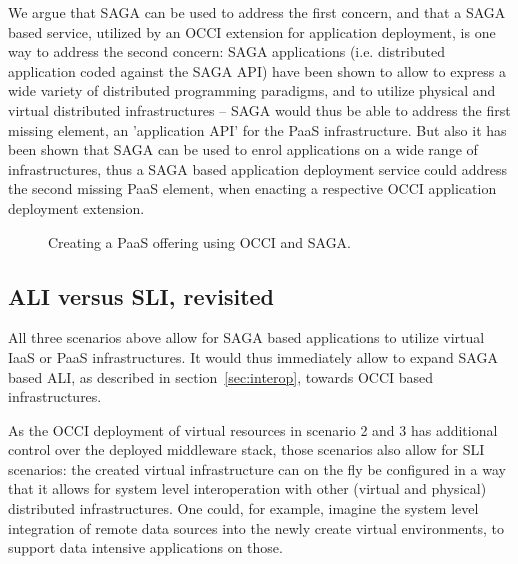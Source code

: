\documentclass[10pt,conference,final,letterpaper,twoside,twocolumn,]{IEEEtran}
\begin{document}
We argue that SAGA can be used to address the first concern, and that
a SAGA based service, utilized by an OCCI extension for application
deployment, is one way to address the second concern: SAGA
applications (i.e. distributed application coded against the SAGA API)
have been shown to allow to express a wide variety of distributed
programming paradigms, and to utilize physical and virtual distributed
infrastructures -- SAGA would thus be able to address the first
missing element, an 'application API' for the PaaS infrastructure.
But also it has been shown that SAGA can be used to enrol applications
on a wide range of infrastructures, thus a SAGA based application
deployment service could address the second missing PaaS element, when
enacting a respective OCCI application deployment extension.

 \begin{figure}[htb]
  \caption{\label{fig:arch3} Creating a PaaS offering using OCCI and SAGA.}
 \end{figure}



 \subsection{ALI versus SLI, revisited}

All three scenarios above allow for SAGA based applications to utilize
virtual IaaS or PaaS infrastructures.  It would thus immediately allow
to expand SAGA based ALI, as described in section~\ref{sec:interop},
towards OCCI based infrastructures.

As the OCCI deployment of virtual resources in scenario 2 and 3 has
additional control over the deployed middleware stack, those scenarios
also allow for SLI scenarios: the created virtual infrastructure can
on the fly be configured in a way that it allows for system level
interoperation with other (virtual and physical) distributed
infrastructures.  One could, for example, imagine the system level
integration of remote data sources into the newly create virtual
environments, to support data intensive applications on those.
\end{document}
